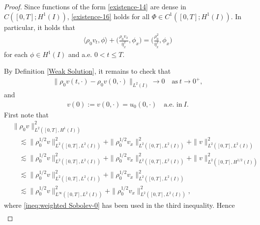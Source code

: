 \documentclass[11pt, reqno]{amsart}
\numberwithin{equation}{section}
\begin{document}
{\begin{proof}
Since functions of the form \eqref{existence-14} are dense in \(C([0,T]; H^1(I))\), 
\eqref{existence-16} holds for all  \(\Phi\in C^1([0,T]; H^1(I))\).	
In particular, it holds that
\begin{equation}\label{existence-weak solution}
	\begin{aligned}
\langle\rho_0v_t, \phi\rangle+\bigg(\frac{\rho_0v_x}{\bar{\eta}_x^2}, \phi_x\bigg)=\bigg({\frac{\rho_0^2}{\bar{\eta}_x^2}}, \phi_x\bigg)
	\end{aligned}
\end{equation}
for each \(\phi\in H^1(I)\) and a.e. \(0< t\leq T\).  

By Definition \ref{Weak Solution}, it remains to check that 
\begin{equation}\label{initial-add-1}
	\begin{aligned}
\|\rho_0v(t,\cdot)-\rho_0v(0, \cdot)\|_{L^2(I)}\to 0\quad \text{as}\ t\to 0^+,
	\end{aligned}
\end{equation}
and
\begin{equation}\label{initial-add-2}
	\begin{aligned}
v(0):=v(0, \cdot)=u_0(0, \cdot) \quad \text{a.e.\ in}\ I.
	\end{aligned}
\end{equation}
First note that
\begin{equation*}
		\begin{aligned}
			&\|\rho_0v\|_{L^2([0,T],H^1(I))}^2\\
&\quad\lesssim \|\rho_0^{1/2}v\|_{L^2([0,T],L^2(I))}^2+\|\rho_0^{1/2}v_x\|_{L^2([0,T],L^2(I))}^2
                                                +\|v\|_{L^2([0,T],L^2(I))}^2\\
                                 &\quad\lesssim \|\rho_0^{1/2}v\|_{L^2([0,T],L^2(I))}^2+\|\rho_0^{1/2}v_x\|_{L^2([0,T],L^2(I))}^2
+\|v\|_{L^2([0,T],H^{1/2}(I))}^2\\
                                 &\quad\lesssim \|\rho_0^{1/2}v\|_{L^2([0,T],L^2(I))}^2+\|\rho_0^{1/2}v_x\|_{L^2([0,T],L^2(I))}^2\\
                                 &\quad\lesssim \|\rho_0^{1/2}v\|_{L^\infty([0,T],L^2(I))}^2+\|\rho_0^{1/2}v_x\|_{L^2([0,T],L^2(I))}^2,
		\end{aligned}
	\end{equation*}	
where \eqref{ineq:weighted Sobolev-0} has been used in the third inequality. Hence
\begin{equation*}
	\begin{aligned} 

\end{aligned}
\end{equation*}
\end{proof}}
\end{document}
